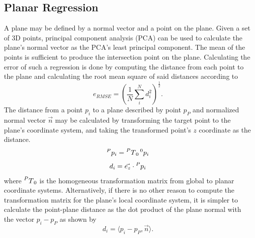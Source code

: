 \subsection{Planar Regression}\label{sec:planar_regression}
A plane may be defined by a normal vector and a point on the plane.
Given a set of 3D points, principal component analysis (PCA) can be used to calculate the plane's normal vector as the PCA's least principal component.
The mean of the points is sufficient to produce the intersection point on the plane.
Calculating the error of such a regression is done by computing the distance from each point to the plane and calculating the root mean square of said distances according to
\begin{equation*}
	e_{RMSE} = \left(\frac{1}{N}\sum_{i}^{N}d_i^2 \right)^{\frac{1}{2}}.
\end{equation*}
The distance from a point $p_i$ to a plane described by point $p_P$ and normalized normal vector $\vec{n}$ may be calculated by transforming the target point to the plane's coordinate system, and taking the transformed point's $z$ coordinate as the distance.
\begin{equation*}
	\prescript{P}{}p_i = \prescript{P}{}T_0 \prescript{0}{}p_i
\end{equation*}
\begin{equation*}
	d_i = \vec{e_z} \cdot \prescript{P}{}p_i
\end{equation*}
where $\prescript{P}{}T_0$ is the homogeneous transformation matrix from global to planar coordinate systems.
Alternatively, if there is no other reason to compute the transformation matrix for the plane's local coordinate system, it is simpler to calculate the point-plane distance as the dot product of the plane normal with the vector $p_i - p_P$ as shown by
\begin{equation*}
	d_i = \langle p_i - p_P, \vec{n}\rangle.
\end{equation*}

